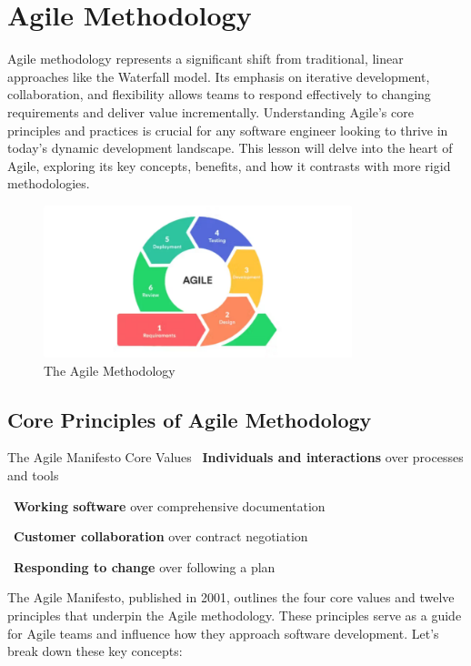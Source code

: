 \section{Agile Methodology}

Agile methodology represents a significant shift from traditional, linear
approaches like the Waterfall model. Its emphasis on iterative development,
collaboration, and flexibility allows teams to respond effectively to changing
requirements and deliver value incrementally. Understanding Agile's core
principles and practices is crucial for any software engineer looking to thrive
in today's dynamic development landscape. This lesson will delve into the heart
of Agile, exploring its key concepts, benefits, and how it contrasts with more
rigid methodologies.

\begin{figure}[ht]
  \centering
  \includegraphics[width=0.8\textwidth]{images/agile_methodology.png}
  \caption{The Agile Methodology}
  \label{fig:agile_methodology}
\end{figure}

\subsection{Core Principles of Agile Methodology}

\begin{conceptcard}{The Agile Manifesto Core Values}
  \faUsers\ \textbf{Individuals and interactions} over processes and tools

  \faCode\ \textbf{Working software} over comprehensive documentation

  \faHandshake\ \textbf{Customer collaboration} over contract negotiation

  \faSync\ \textbf{Responding to change} over following a plan
\end{conceptcard}

The Agile Manifesto, published in 2001, outlines the four core values and
twelve principles that underpin the Agile methodology. These principles serve
as a guide for Agile teams and influence how they approach software
development. Let's break down these key concepts:

